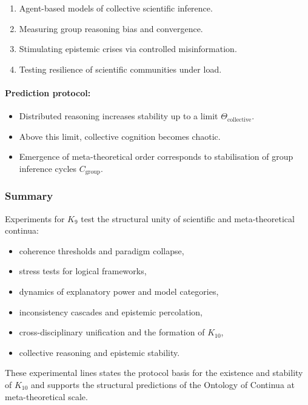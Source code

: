 \begin{enumerate}
    \item Agent-based models of collective scientific inference.
    \item Measuring group reasoning bias and convergence.
    \item Stimulating epistemic crises via controlled misinformation.
    \item Testing resilience of scientific communities under load.
\end{enumerate}

\paragraph{Prediction protocol:}

\begin{itemize}
    \item Distributed reasoning increases stability up to a limit
          $\Theta_{\mathrm{collective}}$.
    \item Above this limit, collective cognition becomes chaotic.
    \item Emergence of meta-theoretical order corresponds to stabilisation
          of group inference cycles $C_{\mathrm{group}}$.
\end{itemize}



\subsubsection{Summary}

Experiments for $K_9$ test the structural unity of scientific and
meta-theoretical continua:

\begin{itemize}
    \item coherence thresholds and paradigm collapse,
    \item stress tests for logical frameworks,
    \item dynamics of explanatory power and model categories,
    \item inconsistency cascades and epistemic percolation,
    \item cross-disciplinary unification and the formation of $K_{10}$,
    \item collective reasoning and epistemic stability.
\end{itemize}

These experimental lines states the protocol basis for the
existence and stability of $K_{10}$ and supports the structural
predictions of the Ontology of Continua at meta-theoretical scale.
